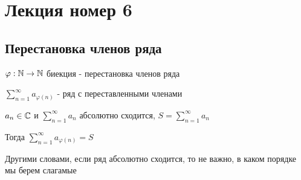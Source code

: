 \section{Лекция номер 6}

\subsection{Перестановка членов ряда}

\newcommand{\sumn}{\sum \limits_{n=1}^\infty}
\newcommand{\sumk}{\sum \limits_{k=1}^n}
\newcommand{\prodn}{\prod \limits_{n=1}^\infty}
\newcommand{\prodk}{\prod \limits_{k=1}^n}

\begin{conj}

    $\varphi: \mathbb{N} \to \mathbb{N}$ биекция - перестановка членов ряда

    $\sum \limits_{n=1}^\infty a_{\varphi(n)}$
     - ряд с переставленными членами
\end{conj}

\begin{theorem}
    $a_n \in \mathbb{C}$ и $\sumn a_n$ абсолютно сходится, $S = \sumn a_n$

    Тогда $\sumn a_{\varphi(n)} = S$
    
    Другими словами, если ряд абсолютно сходится, то не важно, в каком порядке мы берем слагамые

\end{theorem}

